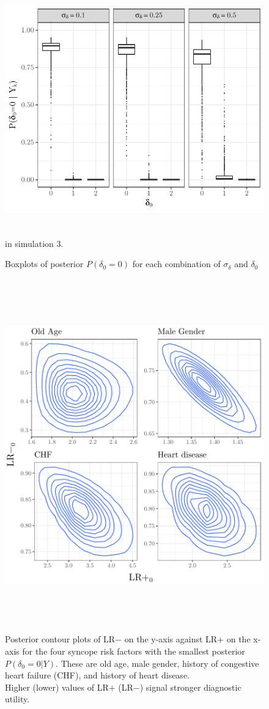 \documentclass[AMA,STIX1COL]{WileyNJD-v2}
\begin{document}
\begin{figure}
\includegraphics[height = 4in, width = 5in]{spike_boxplot.pdf}
\caption{Boxplots of posterior $P(\delta_0 = 0)$ for each combination of $\sigma_\delta$ and $\delta_0$}in simulation 3. 
\label{fig:SSP-boxplot}
\end{figure}

\begin{figure}
\includegraphics[height = 6in, width = 6in]{syncope_contour.pdf}
\caption{Posterior contour plots of LR$-$ on the y-axis against LR$+$ on the x-axis for the four syncope risk factors with the smallest posterior $P(\delta_0 = 0 \vert Y)$. 
These are old age, male gender, history of congestive heart failure (CHF), and history of heart disease. \\
Higher (lower) values of LR$+$ (LR$-$) signal stronger diagnostic utility.}
\label{fig:syncope_contour}
\end{figure}
\end{document}
